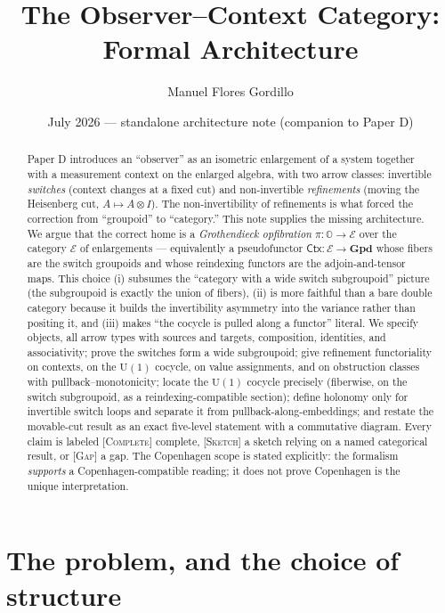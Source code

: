 \documentclass[11pt]{article}
\title{The Observer--Context Category:\\ Formal Architecture}
\author{Manuel Flores Gordillo}
\date{July 2026 --- standalone architecture note (companion to Paper D)}
\theoremstyle{definition}
\theoremstyle{remark}
\newcommand{\Ecat}{\mathcal E}
\newcommand{\Oc}{\mathbb O}
\newcommand{\Ctx}{\mathsf{Ctx}}
\newcommand{\Gpd}{\mathbf{Gpd}}
\newcommand{\U}{\mathrm{U}}
\newcommand{\STC}{{\normalfont\textsc{[Complete]}}}
\newcommand{\STS}{{\normalfont\textsc{[Sketch]}}}
\newcommand{\STG}{{\normalfont\textsc{[Gap]}}}
\begin{document}
\maketitle

\begin{abstract}
Paper D introduces an ``observer'' as an isometric enlargement of a system together
with a measurement context on the enlarged algebra, with two arrow classes:
invertible \emph{switches} (context changes at a fixed cut) and non-invertible
\emph{refinements} (moving the Heisenberg cut, $A\mapsto A\otimes I$). The
non-invertibility of refinements is what forced the correction from ``groupoid'' to
``category.'' This note supplies the missing architecture. We argue that the correct
home is a \emph{Grothendieck opfibration} $\pi:\Oc\to\Ecat$ over the category
$\Ecat$ of enlargements --- equivalently a pseudofunctor $\Ctx:\Ecat\to\Gpd$ whose
fibers are the switch groupoids and whose reindexing functors are the
adjoin-and-tensor maps. This choice (i) subsumes the ``category with a wide switch
subgroupoid'' picture (the subgroupoid is exactly the union of fibers), (ii) is more
faithful than a bare double category because it builds the invertibility asymmetry
into the variance rather than positing it, and (iii) makes ``the cocycle is pulled
along a functor'' literal. We specify objects, all arrow types with sources and
targets, composition, identities, and associativity; prove the switches form a wide
subgroupoid; give refinement functoriality on contexts, on the $\U(1)$ cocycle, on
value assignments, and on obstruction classes with pullback--monotonicity; locate the
$\U(1)$ cocycle precisely (fiberwise, on the switch subgroupoid, as a
reindexing-compatible section); define holonomy only for invertible switch loops and
separate it from pullback-along-embeddings; and restate the movable-cut result as an
exact five-level statement with a commutative diagram. Every claim is labeled
\STC{} complete, \STS{} a sketch relying on a named categorical result, or \STG{} a
gap. The Copenhagen scope is stated explicitly: the formalism \emph{supports} a
Copenhagen-compatible reading; it does not prove Copenhagen is the unique
interpretation.
\end{abstract}

\tableofcontents

\section{The problem, and the choice of structure}\label{sec:choice}
\end{document}
